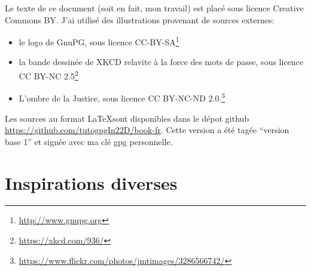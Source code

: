 \documentclass[10pt,a4paper,openany]{book}
\begin{document}
	Le texte de ce document (soit en fait, mon travail) est placé sous licence Creative Commons BY. J'ai utilisé des illustrations provenant de sources externes:
	\begin{itemize}
		\item le logo de GnuPG, sous licence CC-BY-SA\footnote{\url{http://www.gnupg.org}}
		\item la bande dessinée de XKCD relavite à la force des mots de passe, sous licence CC BY-NC 2.5\footnote{\url{https://xkcd.com/936/}}
		\item L'ombre de la Justice, sous licence CC BY-NC-ND 2.0.\footnote{\url{https://www.flickr.com/photos/jmtimages/3286566742/}}
	\end{itemize}
	
	Les sources au format \LaTeX sont disponibles dans le dépot github \url{https://github.com/tutogpgIn22D/book-fr}. Cette version a été tagée ``version base 1'' et signée avec ma clé gpg personnelle.
	
	\tableofcontents
	
	
	
	
		
	
	
	
	
	\chapter{Inspirations diverses}
	
\end{document}

